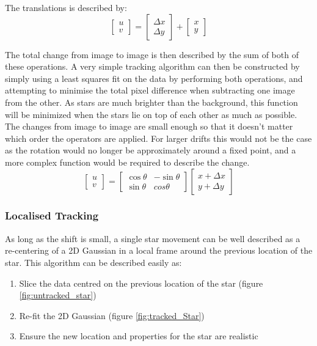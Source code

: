 The translations is described by:
\[
\begin{bmatrix}
    u \\ v
\end{bmatrix}
=
\begin{bmatrix}
    \Delta x \\ \Delta y
\end{bmatrix} +
\begin{bmatrix}
    x \\ y
\end{bmatrix}
\]

The total change from image to image is then described by the sum of both of these operations. A very simple tracking algorithm can then be constructed by simply using a least squares fit on the data by performing both operations, and attempting to minimise the total pixel difference when subtracting one image from the other. As stars are much brighter than the background, this function will be minimized when the stars lie on top of each other as much as possible. The changes from image to image are small enough so that it doesn't matter which order the operators are applied. For larger drifts this would not be the case as the rotation would no longer be approximately around a fixed point, and a more complex function would be required to describe the change.
\[
\begin{bmatrix}
    u \\ v
\end{bmatrix}
=
\begin{bmatrix}
\cos\theta & -\sin\theta \\
\sin\theta & cos\theta
\end{bmatrix}
\begin{bmatrix}
    x + \Delta x \\ y + \Delta y
\end{bmatrix}
\]

\subsubsection{Localised Tracking}

As long as the shift is small, a single star movement can be well described as a re-centering of a 2D Gaussian in a local frame around the previous location of the star. This algorithm can be described easily as:

\begin{enumerate}
    \item Slice the data centred on the previous location of the star (figure \ref{fig:untracked_star})
    \item Re-fit the 2D Gaussian (figure \ref{fig:tracked_Star})
    \item Ensure the new location and properties for the star are realistic
\end{enumerate}

